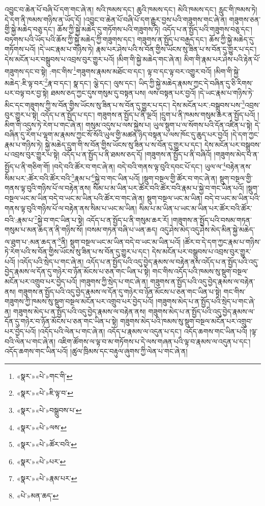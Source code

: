 འབྱུང་བ་ཆེན་པོ་བཞི་པོ་དག་གང་ཞེ་ན། སའི་ཁམས་དང་། ཆུའི་ཁམས་དང་། མེའི་ཁམས་དང་། རླུང་གི་ཁམས་ཏེ། དེ་དག་ནི་ཁམས་གཉིས་ན་ཡོད་དོ། །འབྱུང་བ་ཆེན་པོ་བཞི་པོ་དག་རྒྱུར་བྱས་པའི་གཟུགས་གང་ཞེ་ན། གཟུགས་ཅན་གྱི་སྐྱེ་མཆེད་བཅུ་དང་། ཆོས་ཀྱི་སྐྱེ་མཆེད་དུ་གཏོགས་པའི་གཟུགས་ཏེ། འདོད་པ་ན་སྤྱོད་པའི་གཟུགས་བཅུ་དང་། བཏགས་པའི་ཡོད་པའི་ཆོས་ཀྱི་སྐྱེ་མཆེད་ཀྱི་གཟུགས་དང་། གཟུགས་ན་སྤྱོད་པ་བརྒྱད་དང་། ཆོས་ཀྱི་སྐྱེ་མཆེད་དུ་གཏོགས་པའོ། །དེ་ཡང་རྣམ་པ་གཉིས་ཏེ། རྣམ་པར་ཤེས་པའི་ས་བོན་གྱིས་ཡོངས་སུ་ཟིན་པ་ས་བོན་དུ་གྱུར་པ་དང་། དེས་མངོན་པར་བསྒྲུབས་པ་འབྲས་བུར་གྱུར་པའོ། །མིག་གི་སྐྱེ་མཆེད་གང་ཞེ་ན། མིག་གི་རྣམ་པར་ཤེས་པའི་རྟེན་པོ་གཟུགས་དང་བ་སྟེ། :གང་གིས་\footnote{«སྣར་»«པེ་»གང་གི་}གཟུགས་རྣམས་མཐོང་བ་དང་། ལྟ་བ་དང་ལྟ་བར་འགྱུར་བའོ། །མིག་གི་སྐྱེ་མཆེད་:ཇི་ལྟ་བར་\footnote{«སྣར་»«པེ་»ཇི་ལྟ་བ་}རྣ་བ་དང་། སྣ་དང་། ལྕེ་དང་། ལུས་དང་། ཡིད་ཀྱི་སྐྱེ་མཆེད་རྣམས་ཀྱང་དེ་བཞིན་དུ་ཅི་རིགས་པར་བལྟ་བར་བྱ་སྟེ། ཐམས་ཅད་ཀྱང་དུས་གསུམ་དུ་བསྟན་པས། ལས་བསྟན་པར་བྱའོ། །དེ་ཡང་རྣམ་པ་གཉིས་ཏེ་མིང་དང་གཟུགས་ཀྱི་ས་བོན་གྱིས་ཡོངས་སུ་ཟིན་པ་ས་བོན་དུ་གྱུར་པ་དང་། དེས་མངོན་པར་:བསྒྲུབས་པས་\footnote{«སྣར་»«པེ་»བསྒྲུབས་པ་}འབྲས་བུར་གྱུར་པ་སྟེ། འདོད་པ་ན་སྤྱོད་པ་དང་། གཟུགས་ན་སྤྱོད་པ་ནི་ལྔའོ། །དྲུག་པ་ནི་ཁམས་གསུམ་ཆར་ན་སྤྱོད་པའོ། །མིག་གི་འདུས་ཏེ་རེག་པ་གང་ཞེ་ན། གསུམ་འདུས་པ་ལས་སྐྱེས་པ། ཡུལ་སྡུག་པ་ལ་སོགས་པའི་དོན་འཛིན་པ་སྟེ། དེ་བཞིན་དུ་རེག་པ་ལྷག་མ་རྣམས་ཀྱང་སོ་སོའི་ཡུལ་གྱི་མཚན་ཉིད་བསྟན་པ་ལས་ཁོང་དུ་ཆུད་པར་བྱའོ། །དེ་དག་ཀྱང་རྣམ་པ་གཉིས་ཏེ། སྐྱེ་མཆེད་དྲུག་གི་ས་བོན་གྱིས་ཡོངས་སུ་ཟིན་པ་ས་བོན་དུ་གྱུར་པ་དང་། དེས་མངོན་པར་བསྒྲུབས་པ་འབྲས་བུར་གྱུར་པ་སྟེ། འདོད་པ་ན་སྤྱོད་པ་ནི་ཐམས་ཅད་དོ། །གཟུགས་ན་སྤྱོད་པ་ནི་བཞིའོ། །གཟུགས་མེད་པ་ན་སྤྱོད་པ་ནི་གཅིག་གོ། །བདེ་བའི་ཚོར་བ་གང་ཞེ་ན། བདེ་བའི་གནས་ལྟ་བུའི་དབང་པོ་དང་། ཡུལ་ལ་\footnote{«སྣར་»«པེ་»ལས་}བརྟེན་ནས་སིམ་པར་:ཚོར་བའི་ཚོར་བའི་\footnote{«སྣར་»«པེ་»ཚོར་བའི་}རྣམ་པ་\footnote{«སྣར་»«པེ་»པར་}སྐྱེ་བ་གང་ཡིན་པའོ། །སྡུག་བསྔལ་གྱི་ཚོར་བ་གང་ཞེ་ན། སྡུག་བསྔལ་གྱི་གནས་ལྟ་བུའི་གཉིས་པོ་ལ་བརྟེན་ནས། སིམ་པ་མ་ཡིན་པར་ཚོར་བའི་ཚོར་བའི་རྣམ་པ་སྐྱེ་བ་གང་ཡིན་པའོ། །སྡུག་བསྔལ་ཡང་མ་ཡིན་བདེ་བ་ཡང་མ་ཡིན་པའི་ཚོར་བ་གང་ཞེ་ན། སྡུག་བསྔལ་ཡང་མ་ཡིན། བདེ་བ་ཡང་མ་ཡིན་པའི་གནས་ལྟ་བུའི་གཉིས་པོ་ལ་བརྟེན་ནས་སིམ་པ་ཡང་མ་ཡིན། སིམ་པ་མ་ཡིན་པ་ཡང་མ་ཡིན་པར་ཚོར་བའི་ཚོར་བའི་:རྣམ་པ་\footnote{«སྣར་»«པེ་»རྣམ་པར་}སྐྱེ་བ་གང་ཡིན་པ་སྟེ། འདོད་པ་ན་སྤྱོད་པ་ནི་གསུམ་ཆར་རོ། །གཟུགས་ན་སྤྱོད་པའི་བསམ་གཏན་གསུམ་པ་མན་ཆད་ན་ནི་གཉིས་སོ། །བསམ་གཏན་བཞི་པ་ཡན་ཆད། འདུ་ཤེས་མེད་འདུ་ཤེས་མེད་མིན་སྐྱེ་མཆེད་ལ་ཐུག་པ་:མན་ཆད་ན་\footnote{«པེ་»མན་ཆད་}ནི། སྡུག་བསྔལ་ཡང་མ་ཡིན་བདེ་བ་ཡང་མ་ཡིན་པའོ། །ཚོར་བ་དེ་དག་ཀྱང་རྣམ་པ་གཉིས་ཏེ་རེག་པའི་ས་བོན་གྱིས་ཡོངས་སུ་ཟིན་པ་ས་བོན་དུ་གྱུར་པ་དང་། དེས་མངོན་པར་བསྒྲུབས་པ་འབྲས་བུར་གྱུར་པའོ། །འདོད་པའི་སྲེད་པ་གང་ཞེ་ན། འདོད་པ་ན་སྤྱོད་པའི་འདུ་བྱེད་རྣམས་ལ་བརྟེན་ནས་འདོད་པ་ན་སྤྱོད་པའི་འདུ་བྱེད་རྣམས་ལ་དོན་དུ་གཉེར་བ་ཉོན་མོངས་པ་ཅན་གང་ཡིན་པ་སྟེ། གང་གིས་འདོད་པའི་ཁམས་སུ་སྡུག་བསྔལ་མངོན་པར་འགྲུབ་པར་བྱེད་པའོ། །གཟུགས་ཀྱི་སྲེད་པ་གང་ཞེ་ན། གཟུགས་ན་སྤྱོད་པའི་འདུ་བྱེད་རྣམས་ལ་བརྟེན་ནས། གཟུགས་ན་སྤྱོད་པའི་འདུ་བྱེད་རྣམས་ལ་དོན་དུ་གཉེར་བ་ཉོན་མོངས་པ་ཅན་གང་ཡིན་པ་སྟེ། གང་གིས་གཟུགས་ཀྱི་ཁམས་སུ་སྡུག་བསྔལ་མངོན་པར་འགྲུབ་པར་བྱེད་པའོ། །གཟུགས་མེད་པ་ན་སྤྱོད་པའི་སྲེད་པ་གང་ཞེ་ན། གཟུགས་མེད་པ་ན་སྤྱོད་པའི་འདུ་བྱེད་རྣམས་ལ་བརྟེན་ནས། གཟུགས་མེད་པ་ན་སྤྱོད་པའི་འདུ་བྱེད་རྣམས་ལ་དོན་དུ་གཉེར་བ་ཉོན་མོངས་པ་ཅན་གང་ཡིན་པ་སྟེ། གཟུགས་མེད་པའི་ཁམས་སུ་སྡུག་བསྔལ་མངོན་པར་འགྲུབ་པར་བྱེད་པའོ། །འདོད་པའི་ལེན་པ་གང་ཞེ་ན། འདོད་པ་རྣམས་ལ་འདུན་པ་དང་། འདོད་ཆགས་གང་ཡིན་པའོ། །ལྟ་བའི་ལེན་པ་གང་ཞེ་ན། འཇིག་ཚོགས་ལ་ལྟ་བ་མ་གཏོགས་པ་དེ་ལས་གཞན་པའི་ལྟ་བ་རྣམས་ལ་འདུན་པ་དང་། འདོད་ཆགས་གང་ཡིན་པའོ། །ཚུལ་ཁྲིམས་དང་བརྟུལ་ཞུགས་ཀྱི་ལེན་པ་གང་ཞེ་ན། 